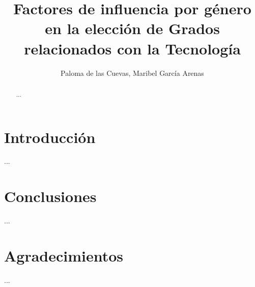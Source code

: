 \documentclass[runningheads,a4paper]{llncs}
\begin{document}

\title{Factores de influencia por género en la elección de Grados relacionados con la Tecnología}


\author{Paloma de las Cuevas, Maribel García Arenas }


\maketitle

%
%
\begin{abstract}
...
\end{abstract}

%
\section{Introducción}


...

\section{Conclusiones}

...


\section*{Agradecimientos} 

...


%




\end{document}
